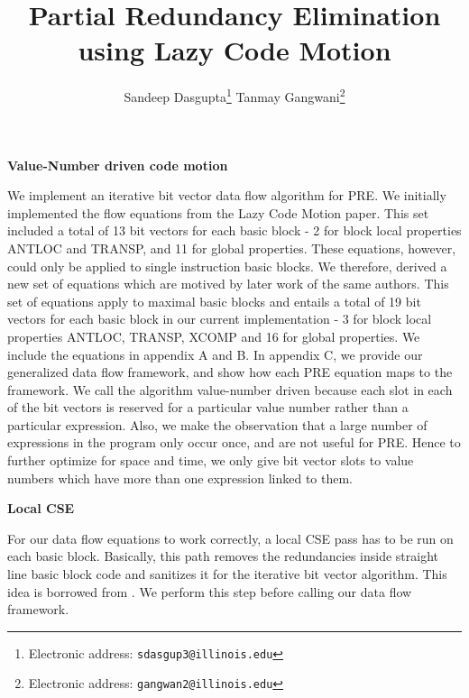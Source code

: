 \documentclass[10pt,twoside]{report}
\title{\textbf{Partial Redundancy Elimination using Lazy Code Motion}}
\author{Sandeep Dasgupta\thanks{Electronic address:
\texttt{sdasgup3@illinois.edu}} \qquad Tanmay Gangwani\thanks{Electronic
address: \texttt{gangwan2@illinois.edu}}}
\begin{document}
\begin{titlepage}
\thispagestyle{empty}
\maketitle
\pagebreak
\end{titlepage}

\begin{flushleft}
\textbf{\Large{Value-Number driven code motion}}
\end{flushleft}
We implement an iterative bit vector data flow algorithm for PRE. We initially
implemented the flow equations from the Lazy Code Motion paper. This set
included a total of 13 bit vectors for each basic block - 2 for block local
properties ANTLOC and TRANSP, and 11 for global properties. These equations,
           however, could only be applied to single instruction basic blocks.
           We therefore, derived a new set of equations which are motived by
           later work\cite{Knoop:1994:OCM:183432.183443} of the same authors.
           This set of equations apply to maximal basic blocks and
           entails a total of 19 bit vectors for each basic block in our
           current implementation - 3 for block local properties ANTLOC,
           TRANSP, XCOMP and 16 for global properties.  We include the
           equations in appendix A and B. In appendix C, we provide our generalized
           data flow framework, and show how each PRE equation maps to the
           framework. We call the algorithm value-number driven because each
           slot in each of the bit vectors is reserved for a particular value
           number rather than a particular expression. Also, we make the
           observation that a large number of expressions in the program only
           occur once, and are not useful for PRE. Hence to further optimize
           for space and time, we only give bit vector slots to value numbers
           which have more than one expression linked to them.

\begin{flushleft}
\textbf{\large{Local CSE}}
\end{flushleft}
For our data flow equations to work correctly, a local CSE pass has to be run
on each basic block. Basically, this path removes the redundancies inside
straight line basic block code and sanitizes it for the iterative bit vector
algorithm. This idea is borrowed from \cite{Knoop:1994:OCM:183432.183443}. We perform this step before calling
our data flow framework. 

\vspace{1 mm}
           




\nocite{*}
\end{document}
